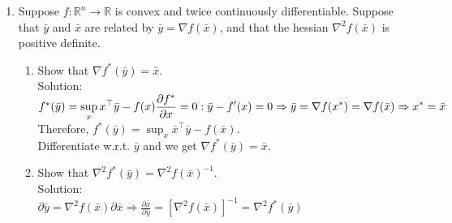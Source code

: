 \documentclass[12pt]{amsart}
\newcommand{\grad}{\nabla}
\begin{document}
\begin{enumerate}
\item Suppose $f: \mathbb{R}^n \rightarrow \mathbb{R}$ is convex and twice continuously differentiable. Suppose that $\bar y$ and $\bar x$ 
are related by $\bar y = \nabla f(\bar x)$, and that the hessian $\nabla^2 f(\bar x)$ is positive definite. 

\begin{enumerate}
\item  Show that $\nabla f^* (\bar y) = \bar x$. \\

\noindent
Solution:\\
$f^*(\bar y) = \displaystyle \sup_x x^\top \bar y - f(x)\\
\frac{\partial f^*}{\partial x} = 0 : \bar y - f'(x) = 0 \Rightarrow \bar y = \grad f(x^*) = \grad f(\bar x) \Rightarrow x^* = \bar x $\\

Therefore, $f^*(\bar y) = \displaystyle \sup_x \bar x^\top \bar y - f(\bar x)$.\\
Differentiate w.r.t. $\bar y$ and we get $\grad f^*(\bar y) = \bar x$.\\

\item Show that $\nabla^2 f^* (\bar y) = \nabla^2 f(\bar x)^{-1}$. \\

\noindent
Solution:\\
$\partial \bar y = \grad^2 f(\bar x) \partial \bar x \Rightarrow \frac{\partial \bar x}{\partial \bar y} = [\grad^2 f(\bar x)]^{-1} = \grad^2 f^*(\bar y)$\\


\end{enumerate}

\end{enumerate}
\end{document}
